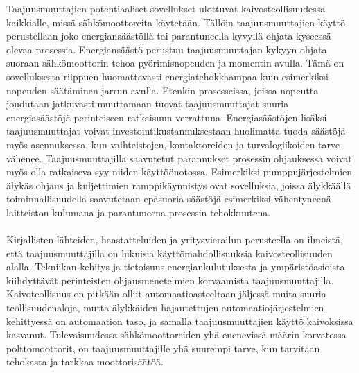 \documentclass[finnish,12pt,a4paper,pdftex,elec,utf8]{aaltothesis}
\begin{document}
Taajuusmuuttajien potentiaaliset sovellukset ulottuvat kaivosteollisuudessa kaikkialle, missä sähkömoottoreita käytetään. Tällöin taajuusmuuttajien käyttö perustellaan joko energiansäästöllä tai parantuneella kyvyllä ohjata kyseessä olevaa prosessia. Energiansäästö perustuu taajuusmuuttajan kykyyn ohjata suoraan sähkömoottorin tehoa pyörimisnopeuden ja momentin avulla. Tämä on sovelluksesta riippuen huomattavasti energiatehokkaampaa kuin esimerkiksi nopeuden säätäminen jarrun avulla. Etenkin prosesseissa, joissa nopeutta joudutaan jatkuvasti muuttamaan tuovat taajuusmuuttajat suuria energiasäästöjä perinteiseen ratkaisuun verrattuna. Energiasäästöjen lisäksi taajuusmuuttajat voivat investointikustannuksestaan huolimatta tuoda säästöjä myös asennuksessa, kun vaihteistojen, kontaktoreiden ja turvalogiikoiden tarve vähenee. Taajuusmuuttajilla saavutetut parannukset prosessin ohjauksessa voivat myös olla ratkaiseva syy niiden käyttöönotossa. Esimerkiksi pumppujärjestelmien älykäs ohjaus ja kuljettimien ramppikäynnistys ovat sovelluksia, joissa älykkäällä toiminnallisuudella saavutetaan epäsuoria säästöjä esimerkiksi vähentyneenä laitteiston kulumana ja parantuneena prosessin tehokkuutena.
\\\\
Kirjallisten lähteiden, haastatteluiden ja yritysvierailun perusteella on ilmeistä, että taajuusmuuttajilla on lukuisia käyttömahdollisuuksia kaivosteollisuuden alalla. Tekniikan kehitys ja tietoisuus energiankulutuksesta ja ympäristöasioista kiihdyttävät perinteisten ohjausmenetelmien korvaamista  taajuusmuuttajilla. Kaivoteollisuus on pitkään ollut automaatioasteeltaan jäljessä muita suuria teollisuudenaloja, mutta älykkäiden hajautettujen automaatiojärjestelmien kehittyessä on automaation taso, ja samalla taajuusmuuttajien käyttö kaivoksissa kasvanut. Tulevaisuudessa sähkömoottoreiden yhä enenevissä määrin korvatessa polttomoottorit, on taajuusmuuttajille yhä suurempi tarve, kun tarvitaan tehokasta ja tarkkaa moottorisäätöä.




\clearpage
\end{document}
